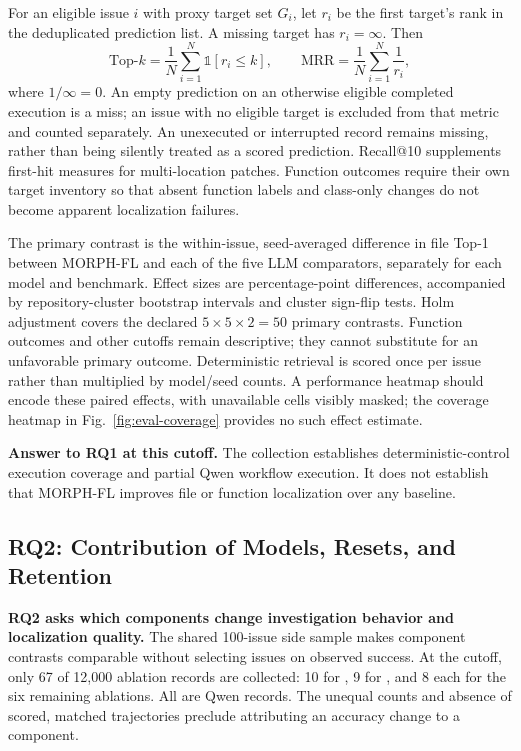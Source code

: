 \documentclass[letterpaper,journal]{IEEEtran}
\newcommand{\code}[1]{\texttt{\detokenize{#1}}}
\begin{document}
For an eligible issue $i$ with proxy target set $G_i$, let $r_i$ be the first target's rank in the deduplicated prediction list. A missing target has $r_i=\infty$. Then
\begin{equation}
 \mathrm{Top}\mbox{-}k=\frac{1}{N}\sum_{i=1}^{N}\mathbb{1}[r_i\leq k],\qquad
 \mathrm{MRR}=\frac{1}{N}\sum_{i=1}^{N}\frac{1}{r_i},
\end{equation}
where $1/\infty=0$. An empty prediction on an otherwise eligible completed execution is a miss; an issue with no eligible target is excluded from that metric and counted separately. An unexecuted or interrupted record remains missing, rather than being silently treated as a scored prediction. Recall@10 supplements first-hit measures for multi-location patches. Function outcomes require their own target inventory so that absent function labels and class-only changes do not become apparent localization failures.

The primary contrast is the within-issue, seed-averaged difference in file Top-1 between MORPH-FL and each of the five LLM comparators, separately for each model and benchmark. Effect sizes are percentage-point differences, accompanied by repository-cluster bootstrap intervals and cluster sign-flip tests. Holm adjustment covers the declared $5\times5\times2=50$ primary contrasts. Function outcomes and other cutoffs remain descriptive; they cannot substitute for an unfavorable primary outcome. Deterministic retrieval is scored once per issue rather than multiplied by model/seed counts. A performance heatmap should encode these paired effects, with unavailable cells visibly masked; the coverage heatmap in Fig.~\ref{fig:eval-coverage} provides no such effect estimate.

\noindent\textbf{Answer to RQ1 at this cutoff.} The collection establishes deterministic-control execution coverage and partial Qwen workflow execution. It does not establish that MORPH-FL improves file or function localization over any baseline.

\subsection{RQ2: Contribution of Models, Resets, and Retention}\label{sec:rq2}
\textbf{RQ2 asks which components change investigation behavior and localization quality.} The shared 100-issue side sample makes component contrasts comparable without selecting issues on observed success. At the cutoff, only 67 of 12,000 ablation records are collected: 10 for \code{context_only}, 9 for \code{single_hypothesis}, and 8 each for the six remaining ablations. All are Qwen records. The unequal counts and absence of scored, matched trajectories preclude attributing an accuracy change to a component.
\end{document}
